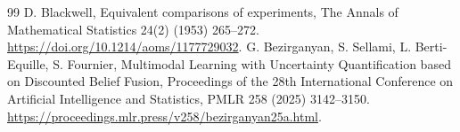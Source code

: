 \documentclass[10pt]{article}
\begin{document}
\begin{thebibliography}{99}
D. Blackwell, Equivalent comparisons of experiments,
The Annals of Mathematical Statistics 24(2) (1953) 265--272.
\url{https://doi.org/10.1214/aoms/1177729032}.
G. Bezirganyan, S. Sellami, L. Berti-Equille, S. Fournier,
Multimodal Learning with Uncertainty Quantification based on Discounted
Belief Fusion, Proceedings of the 28th International Conference on
Artificial Intelligence and Statistics, PMLR 258 (2025) 3142--3150.
\url{https://proceedings.mlr.press/v258/bezirganyan25a.html}.
\end{thebibliography}
\end{document}
